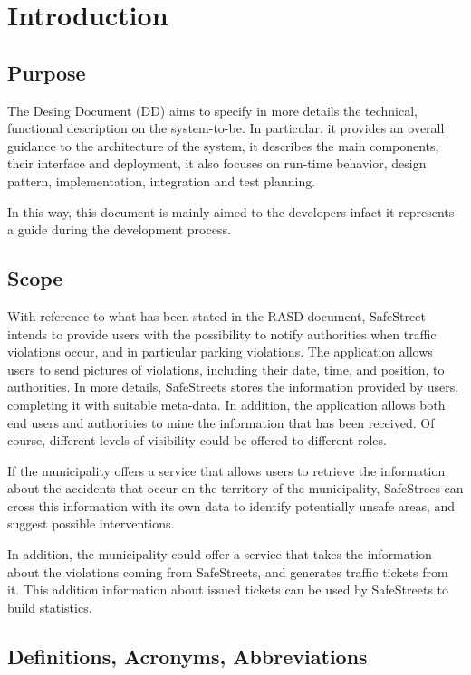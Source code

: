 \documentclass[../RASD.tex]{subfiles}
\begin{document}
    \chapter{Introduction}\label{ch:introduction}
    \section{Purpose}\label{sec:purpose}
    The Desing Document (DD) aims to specify in more details the technical, functional description on the system-to-be. In particular, it provides an overall guidance to the architecture of the system, it describes the main components, their interface and deployment, it also focuses on run-time behavior, design pattern, implementation, integration and test planning.

    In this way, this document is mainly aimed to the developers infact it represents a guide during the development process.
    \newpage
    \section{Scope}\label{sec:scope}
    With reference to what has been stated in the RASD document, SafeStreet intends to provide users with the possibility to notify authorities when traffic violations occur, and in particular parking violations. The application allows users to send pictures of violations, including their date, time, and position, to authorities. In more details, SafeStreets stores the information provided by users, completing it with suitable meta-data. In addition, the application allows both end users and authorities to mine the information that has been received. Of course, different levels of visibility could be offered to different roles.

    If the municipality offers a service that allows users to retrieve the information about the accidents that occur on the territory of the municipality, SafeStrees can cross this information with its own data to identify potentially unsafe areas, and suggest possible interventions.

    In addition, the municipality could offer a service that takes the information about the violations coming from SafeStreets, and generates traffic tickets from it. This addition information about issued tickets can be used by SafeStreets to build statistics.
    \newpage
    \section{Definitions, Acronyms, Abbreviations}\label{sec:definitions,-acronyms,-abbreviations}
\end{document}
